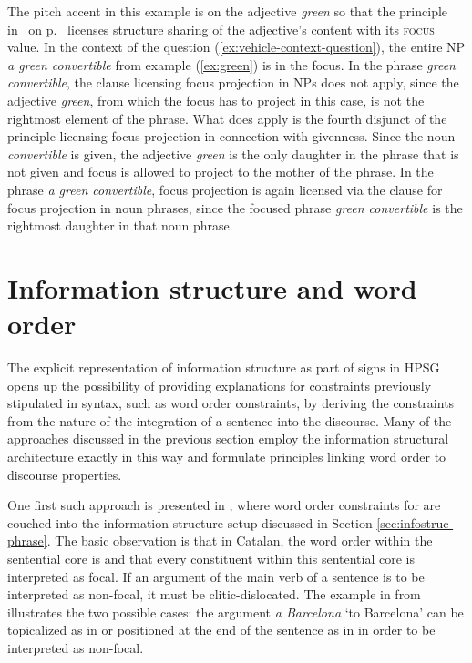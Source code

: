 \documentclass[output=paper
                ,modfonts
                ,nonflat
	        ,collection
	        ,collectionchapter
	        ,collectiontoclongg
 	        ,biblatex
                ,babelshorthands
                ,newtxmath
                ,draftmode
                ,colorlinks, citecolor=brown
]{./langsci/langscibook}
\begin{document}
The pitch accent in this example is on the adjective \textit{green} so
that the principle in~ on p.~\pageref{fig:words} licenses structure
sharing of the adjective's content with its \textsc{focus} value. In
the context of the question (\ref{ex:vehicle-context-question}), the
entire NP \textit{a green convertible} from example (\ref{ex:green}) is
in the focus. In the phrase \textit{green convertible}, the clause
licensing focus projection in NPs does not apply, since the adjective
\textit{green}, from which the focus has to project in this case, is
not the rightmost element of the phrase.  What does apply is the
fourth disjunct of the principle licensing focus projection in
connection with givenness. Since the noun \textit{convertible} is
given, the adjective \textit{green} is the only daughter in the phrase
that is not given and focus is allowed to project to the mother of the
phrase. In the phrase \textit{a green convertible}, focus projection is
again licensed via the clause for focus projection in noun phrases,
since the focused phrase \textit{green convertible} is the rightmost
daughter in that noun phrase.


\section{Information structure and word order}
\label{sec:word-order}
The explicit representation of information structure as part of signs
in HPSG opens up the possibility of providing explanations for
constraints previously stipulated in syntax, such as word order
constraints, by deriving the constraints from the nature of the
integration of a sentence into the discourse. Many of the approaches
discussed in the previous section employ the information structural
architecture exactly in this way and formulate principles linking word
order to discourse properties.

One first such approach is presented in \cite{EV96a}, where word order
constraints for  are couched into the information
structure setup discussed in Section \ref{sec:infostruc-phrase}. The
basic observation is that in Catalan, the word order within the
sentential core is  and that every constituent within this
sentential core is interpreted as focal. If an argument of the main
verb of a sentence is to be interpreted as non-focal, it must be
clitic-dislocated. The example in  from \cite{EV96a}
illustrates the two possible cases: the argument \textit{a Barcelona}
`to Barcelona' can be topicalized as in  or positioned at
the end of the sentence as in  in order to be interpreted
as non-focal.
\end{document}
